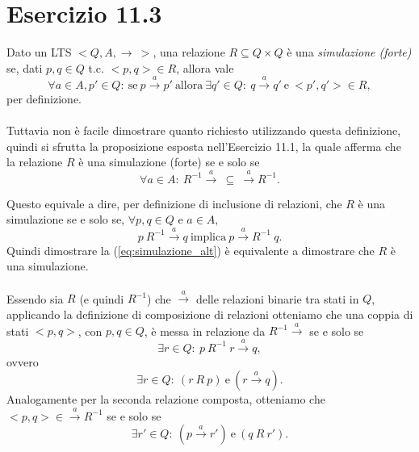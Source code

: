 \section*{Esercizio 11.3}

    
    Dato un LTS $<Q,A,\rightarrow\ >$, una relazione $R \subseteq Q \times Q$ è una \textit{simulazione (forte)} se, dati $p,q\in Q$ t.c. $<p,q>\in R$, allora vale
    \begin{equation*}
        \forall a\in A, p' \in Q:\ \mbox{se}\ p\xrightarrow{a}p'\ \mbox{allora}\ \exists q'\in Q:\ q\xrightarrow{a}q'\ \mbox{e}\ <p',q'>\in R,
    \end{equation*}
    per definizione.\\
    \\
    Tuttavia non è facile dimostrare quanto richiesto utilizzando questa definizione, quindi si sfrutta la proposizione esposta nell'Esercizio 11.1, la quale afferma che la relazione $R$ è una simulazione (forte) se e solo se
    \begin{equation*}
        \forall a\in A:\ R^{-1}\xrightarrow{a} \ \subseteq \ \xrightarrow{a} R^{-1}.
    \end{equation*}
    
    Questo equivale a dire, per definizione di inclusione di relazioni, che $R$ è una simulazione se e solo se, $\forall p,q\in Q$ e $a\in A$,
    \begin{equation}
        p\ R^{-1} \xrightarrow{a} q \ \mbox{implica}\ p \xrightarrow{a} R^{-1}\ q.
        \label{eq:simulazione_alt}
    \end{equation}  
    Quindi dimostrare la (\ref{eq:simulazione_alt}) è equivalente a dimostrare che $R$ è una simulazione.\\ 
    \\
    Essendo sia $R$ (e quindi $R^{-1}$) che $\xrightarrow{a}$ delle relazioni binarie tra stati in $Q$, applicando la definizione di composizione di relazioni otteniamo che una coppia di stati $<p,q>$, con $p,q\in Q$, è messa in relazione da $R^{-1}\xrightarrow{a}$ se e solo se
    \begin{equation*}
        \exists r\in Q:\ p\ R^{-1}\ r \xrightarrow{a} q,
    \end{equation*}
    ovvero
    \begin{equation*}
        \exists r\in Q:\ (r\ R\ p)\ \mbox{e}\ (r \xrightarrow{a} q).
    \end{equation*}
    Analogamente per la seconda relazione composta, otteniamo che $<p,q>\in \xrightarrow{a}R^{-1}$ se e solo se
    \begin{equation*}
        \exists r'\in Q:\ (p \xrightarrow{a} r')\ \mbox{e}\ (q\ R\ r').
    \end{equation*}
    
